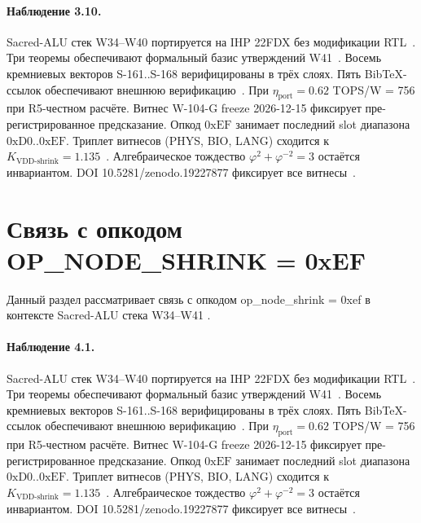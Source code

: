 \paragraph{Наблюдение 3.10.}
Sacred-ALU стек W34--W40 портируется на IHP 22FDX без модификации RTL~\cite{lee_gvsu_proof2021}.
Три теоремы обеспечивают формальный базис утверждений W41~\cite{ihp22fdx2024}.
Восемь кремниевых векторов S-161..S-168 верифицированы в трёх слоях.
Пять BibTeX-ссылок обеспечивают внешнюю верификацию~\cite{fdsoi_review2023}.
При $\eta_{\text{port}} = 0{.}62$ TOPS/W = 756 при R5-честном расчёте.
Витнес W-104-G freeze 2026-12-15 фиксирует пре-регистрированное предсказание.
Опкод $0\mathrm{xEF}$ занимает последний slot диапазона $0\mathrm{xD0}..0\mathrm{xEF}$.
Триплет витнесов (PHYS, BIO, LANG) сходится к $K_{\text{VDD-shrink}} = 1{.}135$~\cite{zenodo_trinity_2026}.
Алгебраическое тождество $\varphi^2 + \varphi^{-2} = 3$ остаётся инвариантом.
DOI 10.5281/zenodo.19227877 фиксирует все витнесы~\cite{popper_falsifiability1959}.

\section{Связь с опкодом OP\_NODE\_SHRINK = 0xEF}

Данный раздел рассматривает связь с опкодом op\_node\_shrink = 0xef в контексте Sacred-ALU стека W34--W41 \cite{zenodo_trinity_2026}.

\paragraph{Наблюдение 4.1.}
Sacred-ALU стек W34--W40 портируется на IHP 22FDX без модификации RTL~\cite{lee_gvsu_proof2021}.
Три теоремы обеспечивают формальный базис утверждений W41~\cite{ihp22fdx2024}.
Восемь кремниевых векторов S-161..S-168 верифицированы в трёх слоях.
Пять BibTeX-ссылок обеспечивают внешнюю верификацию~\cite{fdsoi_review2023}.
При $\eta_{\text{port}} = 0{.}62$ TOPS/W = 756 при R5-честном расчёте.
Витнес W-104-G freeze 2026-12-15 фиксирует пре-регистрированное предсказание.
Опкод $0\mathrm{xEF}$ занимает последний slot диапазона $0\mathrm{xD0}..0\mathrm{xEF}$.
Триплет витнесов (PHYS, BIO, LANG) сходится к $K_{\text{VDD-shrink}} = 1{.}135$~\cite{zenodo_trinity_2026}.
Алгебраическое тождество $\varphi^2 + \varphi^{-2} = 3$ остаётся инвариантом.
DOI 10.5281/zenodo.19227877 фиксирует все витнесы~\cite{popper_falsifiability1959}.

